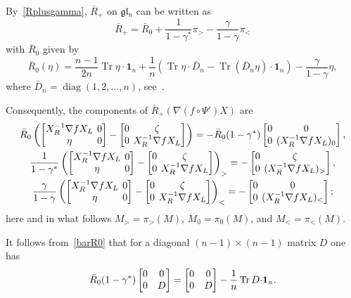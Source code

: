 \documentclass{amsart}
\theoremstyle{definition}
\theoremstyle{remark}
\numberwithin{equation}{section}
\numberwithin{theorem}{section}
\def\nablac{{\nabla}}
\def\gl{\mathfrak g\mathfrak l}
\def\nar{\setlength\arraycolsep{2pt}}
\def\one{\mathbf 1}
\def\Tr{\operatorname{Tr}}
\def\diag{\operatorname{diag}}
\begin{document}
By~\eqref{Rplusgamma}, $\bar R_+$  on $\gl_n$ can be written as
\[
\bar R_+=\bar R_0+\frac1{1-\gamma^*}\pi_>-\frac{\gamma}{1-\gamma}\pi_<
\]
with $\bar R_0$ given by
\begin{equation}\label{barR0}
\bar R_0(\eta)=\frac{n-1}{2n}\Tr\eta{\cdot}\one_n+\frac1n\left(\Tr\eta{\cdot}\bar D_n-\Tr(\bar D_n\eta){\cdot}\one_n\right)
-\frac{\gamma}{1-\gamma}\eta,
\end{equation}
where $\bar D_n=\diag(1,2,\dots,n)$, see~\cite[Lemma 4.1]{GSVMem}.

Consequently, the components of $\bar R_+(\nabla(f\circ\Psi') X)$ are
\begin{gather*}
\bar R_0\nar\left(\begin{bmatrix} X_R^{-1}\nablac f X_L& 0\cr \eta&0\end{bmatrix}
-\begin{bmatrix}0&\zeta\cr 0 &X_R^{-1}\nablac f X_L\end{bmatrix}\right)=
-\bar R_0(1-\gamma^*)\begin{bmatrix} 0 & 0\cr 0 & (X_R^{-1}\nablac f X_L)_0\end{bmatrix},\\
\frac1{1-\gamma^*}\nar\left(\begin{bmatrix} X_R^{-1}\nablac f X_L& 0\cr \eta&0\end{bmatrix}
-\begin{bmatrix}0&\zeta\cr 0 &X_R^{-1}\nablac f X_L\end{bmatrix}\right)_>=
-\begin{bmatrix} 0&\zeta\cr 0& (X_R^{-1}\nablac f X_L)_>\end{bmatrix},\\
\frac{\gamma}{1-\gamma}\nar\left(\begin{bmatrix} X_R^{-1}\nablac f X_L& 0\cr \eta&0\end{bmatrix}
-\begin{bmatrix}0&\zeta\cr 0 &X_R^{-1}\nablac f X_L\end{bmatrix}\right)_<=
-\begin{bmatrix} 0&0\cr 0& (X_R^{-1}\nablac f X_L)_<\end{bmatrix};
\end{gather*}
here and in what follows $M_>=\pi_>(M)$, $M_0=\pi_0(M)$, and $M_<=\pi_<(M)$. 


It follows from~\eqref{barR0} that for a diagonal
$(n-1)\times(n-1)$ matrix $D$ one has
\[
\bar R_0(1-\gamma^*)\begin{bmatrix} 0 & 0\cr 0& D\end{bmatrix}=
\begin{bmatrix} 0 & 0\cr 0& D\end{bmatrix}-\frac1n\Tr D{\cdot}\one_n.
\]
\end{document}
